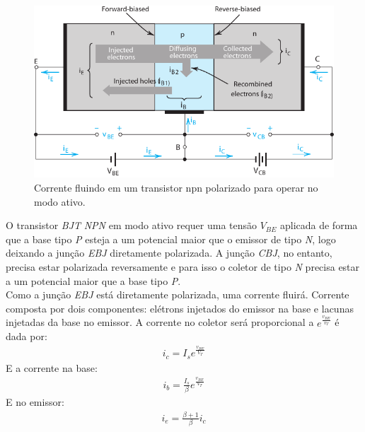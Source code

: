 \documentclass[12pt,a4paper]{article}
\begin{document}
\begin{figure}[htpb]
  \centering
  \includegraphics[width=0.8\linewidth]{img/bjt_current.pdf}
  \caption{Corrente fluindo em um transistor npn polarizado para operar no modo ativo.}
  \label{fig:bjt_current}
\end{figure}

O transistor \emph{BJT} \emph{NPN} em modo ativo requer uma tensão $V_{BE}$ aplicada de forma
que a base tipo \emph{P} esteja a um potencial maior que o emissor de tipo \emph{N}, logo deixando
a junção \emph{EBJ} diretamente polarizada. A junção \emph{CBJ}, no entanto, precisa estar 
polarizada reversamente e para isso o coletor de tipo \emph{N} precisa estar a um potencial maior 
que a base tipo \emph{P}. \\
Como a junção \emph{EBJ} está diretamente polarizada, uma corrente fluirá. Corrente composta por 
dois componentes: elétrons injetados do emissor na base e lacunas injetadas da base no emissor. 
A corrente no coletor será proporcional a $e^{\frac{v_{BE}}{v_{T}}}$ é dada por:
\begin{align*}
  i_c = I_{s}e^{\frac{v_{BE}}{V_{T}}}
\end{align*}
E a corrente na base:
\begin{align*}
  i_b = \frac{I_s}{\beta} e^{\frac{v_{BE}}{V_{T}}}
\end{align*}
E no emissor:
\begin{align*}
  i_e = \frac{\beta +1}{\beta}  i_c
\end{align*}
\end{document}
